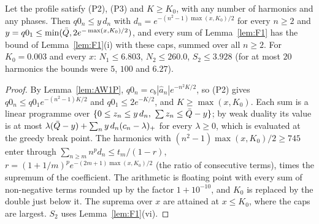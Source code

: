 \begin{lemma} 
\label{lem:F9}
Let the profile satisfy (P2), (P3) and $K\ge K_0$, with any number of harmonics and any phases. Then $q0_n\le y\,d_n$ with
$d_n=e^{-(n^2-1)\max(x,K_0)/2}$ for every $n\ge2$ and $y=q0_1\le\min(\bar Q,2e^{-\max(x,K_0)/2})$, and every sum of Lemma~\ref{lem:F1} has the bound of
Lemma~\ref{lem:F1}(i) with these caps, summed over all $n\ge2$. For $K_0=0.003$ and every $x$: $N_1\le6.803$, $N_2\le260.0$, $S_2\le3.928$ (for at most $20$
harmonics the bounds were $5$, $100$ and $6.27$).
\end{lemma}
\begin{proof}
By Lemma~\ref{lem:AW1P}, $q0_n=c_b|\hat a_n|e^{-n^2K/2}$, so (P2) gives $q0_n\le q0_1e^{-(n^2-1)K/2}$ and $q0_1\le2e^{-K/2}$, and $K\ge\max(x,K_0)$. Each sum is a
linear programme over $\{0\le z_n\le y\,d_n,\ \sum z_n\le\bar Q-y\}$; by weak duality its value is at most $\lambda(\bar Q-y)+\sum_ny\,d_n(c_n-\lambda)_+$ for every
$\lambda\ge0$, which is evaluated at the greedy break point. The harmonics with $(n^2-1)\max(x,K_0)/2\ge745$ enter through $\sum_{n\ge m}n^pd_n\le t_m/(1-r)$,
$r=(1+1/m)^pe^{-(2m+1)\max(x,K_0)/2}$ (the ratio of consecutive terms), times the supremum of the coefficient. The arithmetic is floating point with every
sum of non-negative terms rounded up by the factor $1+10^{-10}$, and $K_0$ is replaced by the double just below it. The suprema over $x$ are attained
at $x\le K_0$, where the caps are largest. $S_2$ uses Lemma~\ref{lem:F1}(vi).
\end{proof}

